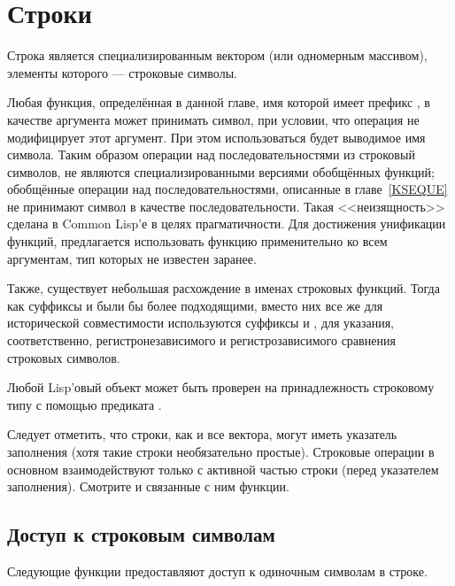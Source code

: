 \else

\chapter{Строки}
\def\pagestatus{FINAL PROOF}

Строка является специализированным вектором (или одномерным массивом), элементы
которого --- строковые символы.

Любая функция, определённая в данной главе, имя которой имеет префикс
, в качестве аргумента может принимать символ, при
условии, что операция не модифицирует этот аргумент.
При этом использоваться будет выводимое имя символа.
Таким образом операции над последовательностями из строковый символов, не
являются специализированными версиями обобщённых функций; обобщённые операции
над последовательностями, описанные в главе~\ref{KSEQUE} не принимают символ в
качестве последовательности. Такая <<неизящность>> сделана в Common Lisp'е в
целях прагматичности. Для достижения унификации функций, предлагается использовать
функцию  применительно ко всем аргументам, тип которых не известен заранее.

Также, существует небольшая расхождение в именах строковых функций.
Тогда как суффиксы  и  были бы более подходящими, вместо
них все же для исторической совместимости используются суффиксы  и
\cdf{=}, для указания, соответственно, регистронезависимого и регистрозависимого
сравнения строковых символов.

Любой Lisp'овый объект может быть проверен на принадлежность строковому типу с
помощью предиката .

Следует отметить, что строки, как и все вектора, могут иметь указатель
заполнения (хотя такие строки необязательно простые).
Строковые операции в основном взаимодействуют только с активной частью строки
(перед указателем заполнения). Смотрите  и связанные с ним
функции.

\section{Доступ к строковым символам}

Следующие функции предоставляют доступ к одиночным символам в строке.

